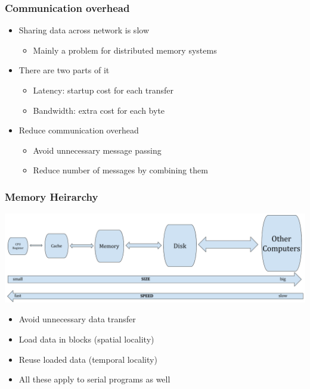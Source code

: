 \documentclass[10pt,t]{beamer}
\begin{document}
\begin{frame}
  \frametitle{Communication overhead}
  \begin{itemize}
  \item Sharing data across network is slow
    \begin{itemize}
    \item Mainly a problem for distributed memory systems
    \end{itemize}
  \item There are two parts of it
    \begin{itemize}
    \item Latency: startup cost for each transfer
    \item Bandwidth: extra cost for each byte
    \end{itemize}
  \item Reduce communication overhead
    \begin{itemize}
    \item Avoid unnecessary message passing
    \item Reduce number of messages by combining them
    \end{itemize}
  \end{itemize}
\end{frame}

\begin{frame}
  \frametitle{Memory Heirarchy}
  \includegraphics[width=\textwidth]{./MemHier}
  \begin{itemize}
  \item Avoid unnecessary data transfer
  \item Load data in blocks (spatial locality)
  \item Reuse loaded data (temporal locality)
  \item All these apply to serial programs as well
  \end{itemize}
\end{frame}
\end{document}
